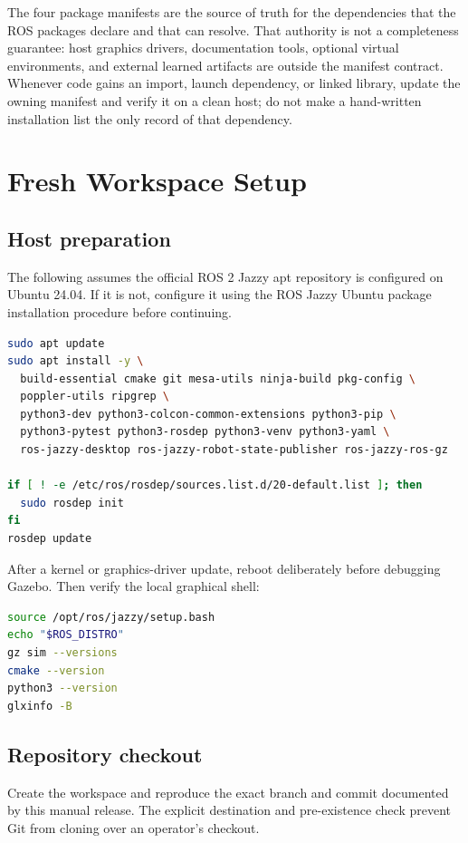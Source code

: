 The four package manifests are the source of truth for the dependencies that
the ROS packages declare and that  can resolve. That authority is
not a completeness guarantee: host graphics drivers, documentation tools,
optional virtual environments, and external learned artifacts are outside the
manifest contract. Whenever code gains an import, launch dependency, or linked
library, update the owning manifest and verify it on a clean host; do not make a
hand-written installation list the only record of that dependency.

\section{Fresh Workspace Setup}

\subsection{Host preparation}

The following assumes the official ROS 2 Jazzy apt repository is configured
on Ubuntu 24.04. If it is not, configure it using the ROS Jazzy Ubuntu package
installation procedure before continuing.

\begin{lstlisting}[language=bash]
sudo apt update
sudo apt install -y \
  build-essential cmake git mesa-utils ninja-build pkg-config \
  poppler-utils ripgrep \
  python3-dev python3-colcon-common-extensions python3-pip \
  python3-pytest python3-rosdep python3-venv python3-yaml \
  ros-jazzy-desktop ros-jazzy-robot-state-publisher ros-jazzy-ros-gz

if [ ! -e /etc/ros/rosdep/sources.list.d/20-default.list ]; then
  sudo rosdep init
fi
rosdep update
\end{lstlisting}

After a kernel or graphics-driver update, reboot deliberately before debugging
Gazebo. Then verify the local graphical shell:

\begin{lstlisting}[language=bash]
source /opt/ros/jazzy/setup.bash
echo "$ROS_DISTRO"
gz sim --versions
cmake --version
python3 --version
glxinfo -B
\end{lstlisting}

\subsection{Repository checkout}

Create the workspace and reproduce the exact branch and commit documented by
this manual release. The explicit destination and pre-existence check prevent
Git from cloning over an operator's checkout.

